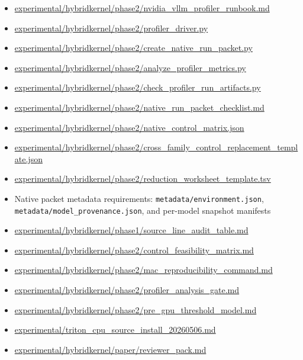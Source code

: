 \documentclass{article}
\begin{document}
\begin{itemize}
\item \url{experimental/hybridkernel/phase2/nvidia_vllm_profiler_runbook.md}
\item \url{experimental/hybridkernel/phase2/profiler_driver.py}
\item \url{experimental/hybridkernel/phase2/create_native_run_packet.py}
\item \url{experimental/hybridkernel/phase2/analyze_profiler_metrics.py}
\item \url{experimental/hybridkernel/phase2/check_profiler_run_artifacts.py}
\item \url{experimental/hybridkernel/phase2/native_run_packet_checklist.md}
\item \url{experimental/hybridkernel/phase2/native_control_matrix.json}
\item \url{experimental/hybridkernel/phase2/cross_family_control_replacement_template.json}
\item \url{experimental/hybridkernel/phase2/reduction_worksheet_template.tsv}
\item Native packet metadata requirements: \texttt{metadata/environment.json}, \texttt{metadata/model\_provenance.json}, and per-model snapshot manifests
\item \url{experimental/hybridkernel/phase1/source_line_audit_table.md}
\item \url{experimental/hybridkernel/phase2/control_feasibility_matrix.md}
\item \url{experimental/hybridkernel/phase2/mac_reproducibility_command.md}
\item \url{experimental/hybridkernel/phase2/profiler_analysis_gate.md}
\item \url{experimental/hybridkernel/phase2/pre_gpu_threshold_model.md}
\item \url{experimental/triton_cpu_source_install_20260506.md}
\item \url{experimental/hybridkernel/paper/reviewer_pack.md}
\end{itemize}
\end{document}
